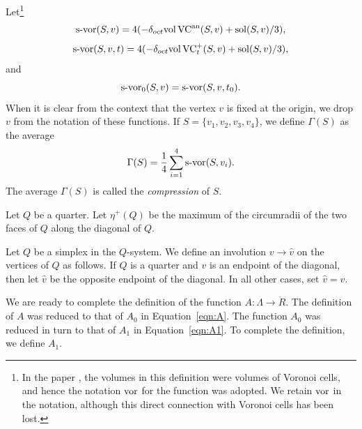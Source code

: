 \begin{definition}\label{def:svor}
   Let\footnote{In the paper \cite{spp}, the volumes in this definition were
   volumes of Voronoi cells, and hence the notation $\operatorname{vor}$ for the function was
adopted. We retain $\operatorname{vor}$ in the notation, although this direct
connection with Voronoi cells has been lost.}
      $$
      \operatorname{s-vor}(S,v) = 4(-\delta_{oct} {\operatorname{vol}}\,{\operatorname{VC}}^{{\operatorname{an}}}(S,v)
         +\operatorname{sol}(S,v)/3),$$
      $$
      \operatorname{s-vor}(S,v,t) = 4(-\delta_{oct} {\operatorname{vol}}\,{\operatorname{VC}}^+_{t}(S,v)
         +\operatorname{sol}(S,v)/3),$$
   and
      $$
      \operatorname{s-vor}_0(S,v) = \operatorname{s-vor}(S,v,t_0).
      $$
   When it is clear from the context that the vertex $v$ is
   fixed at the origin, we drop $v$ from the notation of these
   functions.
   If $S=\{v_1,v_2,v_3,v_4\}$, we define $\Gamma(S)$ as the average
   \begin{equation}
   \Gamma(S) = \frac{1}{4}\sum_{i=1}^4\operatorname{s-vor}(S,v_i).
   \label{eqn:gamma}
   \end{equation}
   The average $\Gamma(S)$ is called the {\it compression} of $S$.
%
\end{definition}

\begin{definition}
Let $Q$ be a quarter.   Let $\eta^+(Q)$ be the maximum of the
circumradii of the two faces of $Q$ along the diagonal of $Q$.
\end{definition}

Let $Q$ be a simplex in the $Q$-system.  We define an involution
$v\to \hat v$ on the vertices of $Q$ as follows.  If $Q$ is a
quarter and $v$ is an endpoint of the diagonal, then let $\hat v$
be the opposite endpoint of the diagonal.  In all other cases, set
$\hat v = v$.

We are ready to complete the definition of the function
$A:\Lambda\to\ring{R}$.  The definition of $A$ was reduced to that
of $A_0$ in Equation~\ref{eqn:A}.  The function $A_0$ was reduced
in turn to that of $A_1$ in Equation~\ref{eqn:A1}. To complete the
definition, we define $A_1$.

